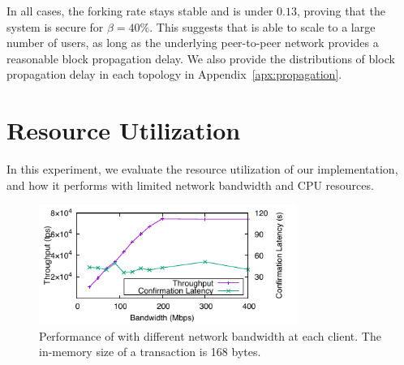 In all cases, the forking rate stays stable and is under $0.13$, proving that the system is secure for $\beta=40\%$. This suggests that \prism is able to scale to a large number of users, as long as the underlying peer-to-peer network provides a reasonable block propagation delay. We also provide the distributions of block propagation delay in each topology in Appendix~\ref{apx:propagation}.

\section{Resource Utilization}
\label{sec:eval-resource}

In this experiment, we evaluate the resource utilization of our \prism implementation, and how it performs with limited network bandwidth and CPU resources. 





\begin{figure}
    \centering
    \includegraphics[width=0.75\textwidth]{figures/resource-fig-bw.pdf}
    \caption[Performance of Prism with different network bandwidth at each client.]{Performance of \prism with different network bandwidth at each client. The in-memory size of a transaction is 168 bytes.}
    \label{fig:bw}
\end{figure}

